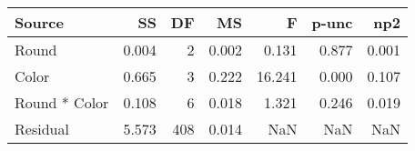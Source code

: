 \begin{tabular}{lrrrrrr}
\toprule
        Source &     SS &   DF &     MS &       F &  p-unc &    np2 \\
\midrule
         Round &  0.004 &    2 &  0.002 &   0.131 &  0.877 &  0.001 \\
         Color &  0.665 &    3 &  0.222 &  16.241 &  0.000 &  0.107 \\
 Round * Color &  0.108 &    6 &  0.018 &   1.321 &  0.246 &  0.019 \\
      Residual &  5.573 &  408 &  0.014 &     NaN &    NaN &    NaN \\
\bottomrule
\end{tabular}
